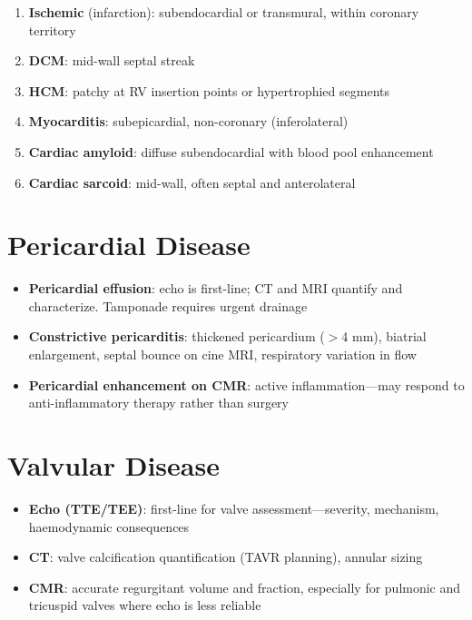 \begin{pearlbox}
\begin{enumerate}
  \item \textbf{Ischemic} (infarction): subendocardial or transmural, within coronary territory
  \item \textbf{DCM}: mid-wall septal streak
  \item \textbf{HCM}: patchy at RV insertion points or hypertrophied segments
  \item \textbf{Myocarditis}: subepicardial, non-coronary (inferolateral)
  \item \textbf{Cardiac amyloid}: diffuse subendocardial with blood pool enhancement
  \item \textbf{Cardiac sarcoid}: mid-wall, often septal and anterolateral
\end{enumerate}
\end{pearlbox}

\section{Pericardial Disease}
\begin{itemize}
  \item \textbf{Pericardial effusion}: echo is first-line; CT and MRI quantify and characterize. Tamponade requires urgent drainage
  \item \textbf{Constrictive pericarditis}: thickened pericardium ($>$4 mm), biatrial enlargement, septal bounce on cine MRI, respiratory variation in flow
  \item \textbf{Pericardial enhancement on CMR}: active inflammation---may respond to anti-inflammatory therapy rather than surgery
\end{itemize}

\section{Valvular Disease}
\begin{itemize}
  \item \textbf{Echo (TTE/TEE)}: first-line for valve assessment---severity, mechanism, haemodynamic consequences
  \item \textbf{CT}: valve calcification quantification (TAVR planning), annular sizing
  \item \textbf{CMR}: accurate regurgitant volume and fraction, especially for pulmonic and tricuspid valves where echo is less reliable
\end{itemize}

